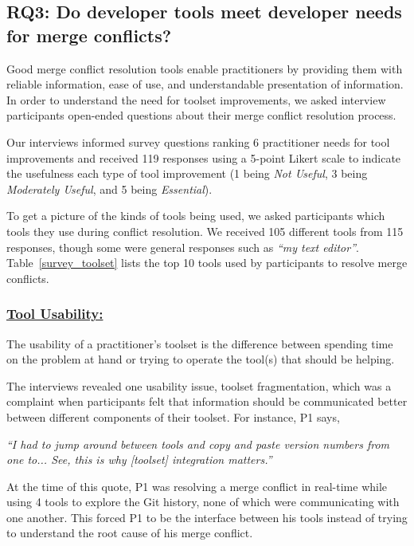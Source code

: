 \subsection{\textbf{RQ3:} Do developer tools meet developer needs for merge conflicts?}\label{RQ3}
Good merge conflict resolution tools enable practitioners by providing them with reliable information, ease of use, and understandable presentation of information. In order to understand the need for toolset improvements, we asked interview participants open-ended questions about their merge conflict resolution process.

Our interviews informed survey questions ranking 6 practitioner needs for tool improvements and received 119 responses using a 5-point Likert scale to indicate the usefulness each type of tool improvement (1 being \textit{Not Useful}, 3 being \textit{Moderately Useful}, and 5 being \textit{Essential}).

To get a picture of the kinds of tools being used, we asked participants which tools they use during conflict resolution. We received 105 different tools from 115 responses, though some were general responses such as \textit{``my text editor''}. Table~\ref{survey_toolset} lists the top 10 tools used by participants to resolve merge conflicts.


\subsubsection{\underline{Tool Usability:}} The usability of a practitioner's toolset is the difference between spending time on the problem at hand or trying to operate the tool(s) that should be helping. 

The interviews revealed one usability issue, toolset fragmentation, which was a complaint when participants felt that information should be communicated better between different components of their toolset. For instance, P1 says, 

\begin{displayquote}
\textit{``I had to jump around between tools and copy and paste version numbers from one to... See, this is why [toolset] integration matters.''}
\end{displayquote}

At the time of this quote, P1 was resolving a merge conflict in real-time while using 4 tools to explore the Git history, none of which were communicating with one another. This forced P1 to be the interface between his tools instead of trying to understand the root cause of his merge conflict.

